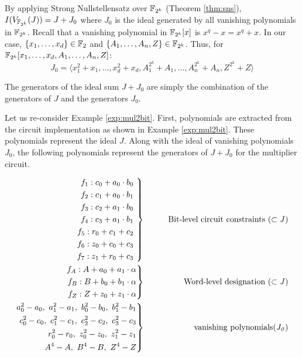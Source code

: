 By applying Strong Nullstellensatz over ${\mathbb{F}}_{2^k}$ (Theorem \ref{thm:sns}), 
$I(V_{{\mathbb{F}}_{2^k}}(J))=J+J_0$ where
$J_0$ is the ideal generated by all vanishing polynomials in ${\mathbb{F}}_{2^k}$. 
Recall that a vanishing polynomial in ${\mathbb{F}}_{2^k}[x]$ is $x^q-x=x^q+x$. 
In our case, 
$\{x_1,\dots,x_d\} \in {\mathbb{F}}_2$ and $\{A_1,\dots,A_n,Z\} \in {\mathbb{F}}_{2^k}$.
Thus, for ${\mathbb{F}}_{2^k}[x_1,\dots,x_d,A_1,\dots,A_n,Z]$: 
\begin{equation}
J_0 = \langle x_1^2+x_1,\dots,x_d^2+x_d, A_1^{2^k}+A_1,\dots,A_n^{2^k}+A_n,Z^{2^k}+Z\rangle \nonumber
\end{equation}

The generators of the ideal sum $J+J_0$ are simply the combination of the 
generators of $J$ and the generators $J_0$.

\begin{Example}
\label{exp:finalMul2Bit}
Let us re-consider Example \ref{exp:mul2bit}. First, polynomials are
extracted from the circuit implementation as
shown in Example \ref{exp:mul2bit}. These polynomials represent the
ideal $J$. Along with the ideal of vanishing polynomials $J_0$, 
the following polynomials represent the generators 
of $J+J_0$ for the multiplier circuit. 

\begin{eqnarray}
 \left .  
	\begin{aligned}
		f_1:c_0+a_0 \cdot b_0  \\
		f_2:c_1+a_0 \cdot b_1  \\
		f_3:c_2+a_1 \cdot b_0  \\
		f_4:c_3+a_1 \cdot b_1  \\
		f_5:r_0+c_1 + c_2		\\
		f_6:z_0+c_0 + c_3		\\
		f_7:z_1+r_0 + c_3		
	\end{aligned} 
 \ \right\}
 &\qquad&  {\it  \text{Bit-level circuit constraints} ~(\subset J)} \nonumber \\
 \left . 
	\begin{aligned}
		f_{A}:A+a_0+a_1\cdot \alpha   \\ 
		f_{B}:B+b_0+b_1\cdot \alpha  \\ 
		f_{Z}:Z+z_0+z_1\cdot \alpha   
	\end{aligned} 
 \right\}
 &\qquad&  {\it  \text{Word-level designation} ~(\subset J)} \nonumber \\
  \left . 
	\begin{aligned}
		a_0^2-a_0, ~a_1^2-a_1,~b_0^2-b_0, ~b_1^2-b_1   \\ 
		c_0^2-c_0, ~c_1^2-c_1,~c_2^2-c_2, ~c_3^2-c_3  \\ 
		r_0^2-r_0, ~z_0^2-z_0,~z_1^2-z_1    \\ 
		A^4-A, ~B^4-B ,~Z^4-Z		  
	\end{aligned} 
 \right\}
 &\qquad&  {\it \text{vanishing polynomials} (J_0)} \nonumber
\end{eqnarray}
 
\end{Example}


